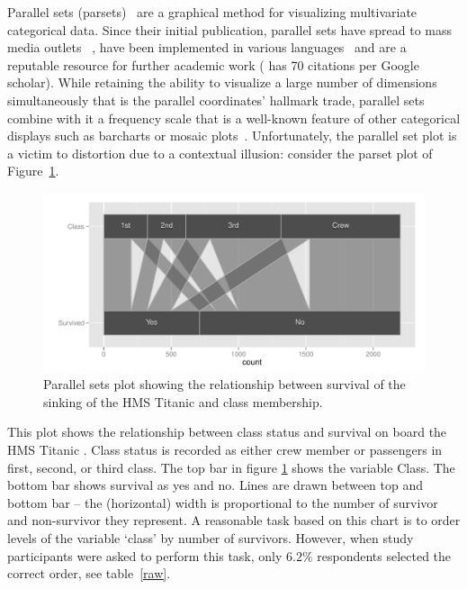 Parallel sets (parsets)~\cite{kosara:2006} are a graphical method  for visualizing multivariate categorical data. Since their initial publication, parallel sets have spread to mass media outlets ~\cite{eagereyes, bostock:2012, bbc:2009}, have been implemented in various languages~\cite{eagereyes, d3, davies} and are a reputable resource for further academic work (\cite{kosara:2006} has 70 citations per Google scholar). While retaining the %
ability to visualize a large number of dimensions simultaneously that is the parallel coordinates' hallmark trade, parallel sets combine with it a frequency scale that is a well-known feature of other categorical displays such as barcharts or mosaic plots~\cite{hartigan:1981, friendly:1992, hofmann:2000, theus:1997}.
Unfortunately, the parallel set plot is a victim to distortion due to a contextual illusion: consider the parset plot of Figure~\ref{question1a}.
%
\begin{figure}[hbtp]
\centering
\includegraphics[width=.9\linewidth]{images/parset-titanic}
\caption{\label{question1a} Parallel sets plot showing the relationship between survival of the sinking of the HMS Titanic and class membership. }
\end{figure}
%
This plot shows the relationship between class status and survival on board the HMS Titanic  \cite{dawson:1995}. Class status is recorded as either crew member or passengers in  first, second, or third class.  The top bar in figure \ref{question1a} shows the  variable Class. The bottom bar shows survival  as yes and no.
 Lines are drawn between top and bottom bar -- the  (horizontal) width is proportional to the number of survivor and non-survivor they represent. 
 A reasonable task based on this chart is to order levels of the variable `class' by number of survivors. However, when study participants were asked to perform this task, only $6.2\%$ respondents 
selected the correct order, see table~\ref{raw}.

